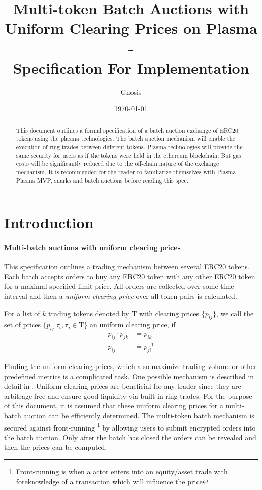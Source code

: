 \documentclass[11pt,parskip=full]{scrartcl}%
\title{
  Multi-token Batch Auctions with Uniform Clearing Prices on Plasma\\
  - \\
  \Large Specification For Implementation}
\author{Gnosis}
\date{\today}
\newcommand{\Tau}{\mathrm{T}}
\newcommand*{\erc}{ERC20 }
\begin{document}
\maketitle


\begin{abstract}

This document outlines a formal specification of a batch auction exchange of ERC20 tokens using the plasma technologies. 
The batch auction mechanism will enable the execution of ring trades between different tokens. 
Plasma technologies will provide the same security for users as if the tokens were held in the ethereum blockchain. 
But gas costs will be significantly reduced due to the off-chain nature of the exchange mechanism. 
It is recommended for the reader to familiarize themselves with Plasma\cite{plasma}, Plasma MVP\cite{MVP}, snarks\cite{snarks} and batch auctions\cite{batch} before reading this spec. 

\end{abstract}

\tableofcontents

\newpage
\section{Introduction}
\label{sec:introduction}

\paragraph{Multi-batch auctions with uniform clearing prices}

This specification outlines a trading mechanism between several \erc tokens. Each batch accepts orders to buy any \erc token with any other \erc token for a maximal specified limit price. All orders are collected over some time interval and then a \emph{uniform clearing price} over all token pairs is calculated. 

For a list of $k$ trading tokens denoted by $\Tau$ with clearing prices $\{p_{ij}\}$, we call the set of prices $\{p_{ij}| \tau_i, \tau_j \in \Tau\}$ an uniform clearing price, if
\begin{align} \label{arbitrage_free}
  p_{ij} \cdot p_{jk} &= p_{ik}\\
  p_{ij} &= p_{ji}^{-1}
\end{align}


Finding the uniform clearing prices, which also maximize trading volume or other predefined metrics is a complicated task. One possible mechanism is described in detail in \cite{priceOptimization}. Uniform clearing prices are beneficial for any trader since they are arbitrage-free and ensure good liquidity via built-in ring trades. For the purpose of this document, it is assumed that these uniform clearing prices for a multi-batch auction can be efficiently determined. \newline
The multi-token batch mechanism is secured against front-running \footnote{Front-running is when a actor enters into an equity/asset trade with foreknowledge of a transaction which will influence the price} by allowing users to submit encrypted orders into the batch auction. Only after the batch has closed the orders can be revealed and then the prices can be computed. 
\end{document}
